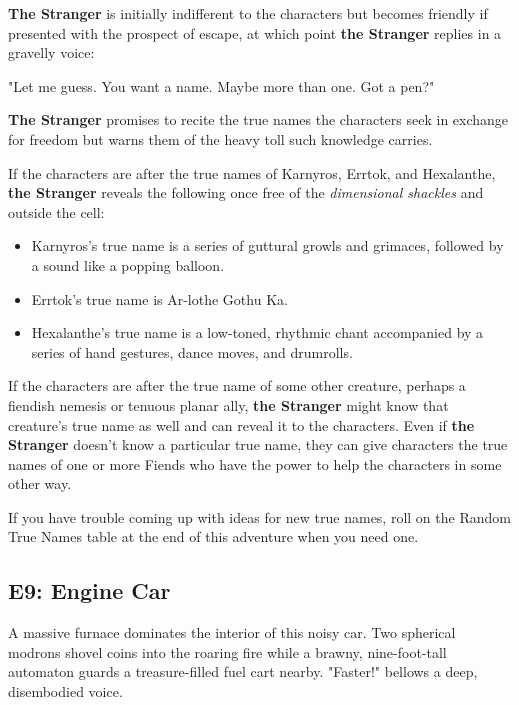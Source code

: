 \documentclass[10pt,a4paper,twoside,bg=print,twocolumn,openany,nodeprecatedcode]{dndbook}
\begin{document}
\textbf{The Stranger} is initially indifferent to the characters but becomes friendly if presented with the prospect of escape, at which point \textbf{the Stranger} replies in a gravelly voice:

\begin{DndReadAloud}{}
"Let me guess. You want a name. Maybe more than one. Got a pen?"

\end{DndReadAloud}

\textbf{The Stranger} promises to recite the true names the characters seek in exchange for freedom but warns them of the heavy toll such knowledge carries.

If the characters are after the true names of Karnyros, Errtok, and Hexalanthe, \textbf{the Stranger} reveals the following once free of the \textit{dimensional shackles} and outside the cell:


\begin{itemize}
\item Karnyros's true name is a series of guttural growls and grimaces, followed by a sound like a popping balloon.
\item Errtok's true name is Ar-lothe Gothu Ka.
\item Hexalanthe's true name is a low-toned, rhythmic chant accompanied by a series of hand gestures, dance moves, and drumrolls.
\end{itemize}

If the characters are after the true name of some other creature, perhaps a fiendish nemesis or tenuous planar ally, \textbf{the Stranger} might know that creature's true name as well and can reveal it to the characters. Even if \textbf{the Stranger} doesn't know a particular true name, they can give characters the true names of one or more Fiends who have the power to help the characters in some other way.

If you have trouble coming up with ideas for new true names, roll on the Random True Names table at the end of this adventure when you need one.

\subsection{E9: Engine Car}
\begin{DndReadAloud}{}
A massive furnace dominates the interior of this noisy car. Two spherical modrons shovel coins into the roaring fire while a brawny, nine-foot-tall automaton guards a treasure-filled fuel cart nearby. "Faster!" bellows a deep, disembodied voice.

\end{DndReadAloud}
\end{document}
